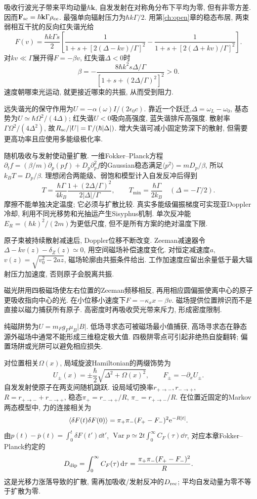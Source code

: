 吸收行波光子带来平均动量$\hbar\mathbf k$, 自发发射在对称角分布下平均为零, 但有非零方差. 因而$\mathbf F_{\rm sc}=\hbar\mathbf k\Gamma\rho_{ee}$. 最强单向辐射压力为$\hbar k\Gamma/2$. 用第\ref{ch:open}章的稳态布居, 两束弱相互干扰的反向红失谐光给
\[F(v)=\frac{\hbar k\Gamma s}{2}\left[\frac1{1+s+[2(\Delta-kv)/\Gamma]^2}-\frac1{1+s+[2(\Delta+kv)/\Gamma]^2}\right].\]
对$kv\ll\Gamma$展开得$F=-\beta v$, 红失谐$\Delta<0$时
\[\beta=-\frac{8\hbar k^2s\Delta/\Gamma}{[1+s+(2\Delta/\Gamma)^2]^2}>0.\]
速度朝哪束光运动, 就更接近哪束的共振, 从而受到阻力.

远失谐光的保守作用为$U=-\alpha(\omega)I/(2\epsilon_0c)$. 靠近一个跃迁,$\Delta=\omega_L-\omega_0$, 基态势为$U\simeq\hbar\Omega^2/(4\Delta)$; 红失谐$U<0$吸向高强度, 蓝失谐排斥高强度. 散射率$\Gamma\Omega^2/(4\Delta^2)$, 故$R_{\rm sc}/|U|=\Gamma/(\hbar|\Delta|)$. 增大失谐可减小固定势深下的散射, 但需要更高功率且应使用多能级极化率.

随机吸收与发射使动量扩散. 一维Fokker--Planck方程$\partial_tf=(\beta/m)\partial_p(pf)+D_p\partial_p^2f$的Gaussian稳态满足$\langle p^2\rangle=mD_p/\beta$, 所以$k_BT=D_p/\beta$. 理想闭合两能级、弱饱和模型计入自发反冲后得到
\[T=\frac{\hbar\Gamma}{4k_B}\frac{1+(2\Delta/\Gamma)^2}{2|\Delta|/\Gamma},\qquad T_{\min}=\frac{\hbar\Gamma}{2k_B}\quad(\Delta=-\Gamma/2).\]
摩擦不能单独决定温度; 它必须与扩散比较. 真实多能级偏振梯度可实现亚Doppler冷却, 利用不同光移势和光抽运产生Sisyphus机制. 单次反冲能$E_R=(\hbar k)^2/(2m)$为更低尺度, 但不是所有方案的绝对温度下限.

原子束被持续散射减速后, Doppler位移不断改变. Zeeman减速器令$\Delta-kv(z)-\delta_Z(z)\simeq0$, 用空间磁场补偿速度变化. 对恒定减速度$a$, $v(z)=\sqrt{v_0^2-2az}$, 磁场轮廓由共振条件给出. 工作加速度应留出余量低于最大辐射压力加速度, 否则原子会脱离共振.

磁光阱用四极磁场使左右位置的Zeeman频移相反, 再用相应圆偏振使离中心的原子更吸收指向中心的光. 在小位移小速度下$F=-\kappa_xx-\beta v$. 磁场提供位置辨识而不是直接以磁力捕获所有原子. 高密度时再吸收荧光带来斥力, 形成密度限制.

纯磁阱势为$U=m_Fg_F\mu_B|B|$. 低场寻求态可被磁场最小值捕获, 高场寻求态在静态源外磁场中通常不能形成三维稳定极大值. 四极阱零点可引起非绝热自旋翻转; 偏置场阱或光阱可以避免相应损失.

对位置相关$\Omega(x)$, 局域旋波Hamiltonian的两缀饰势为
\[U_\pm(x)=\pm\frac{\hbar}{2}\sqrt{\Delta^2+\Omega(x)^2},\qquad
 F_\pm=-\partial_xU_\pm.\]
自发发射使原子在两支间随机跳跃. 设局域切换率$r_{+\to-},r_{-\to+}$, $R=r_{+\to-}+r_{-\to+}$, 稳态$\pi_+=r_{-\to+}/R$, $\pi_-=r_{+\to-}/R$. 在位置近固定的Markov两态模型中, 力的连接相关为
\[\langle\delta F(t)\delta F(0)\rangle=
 \pi_+\pi_-(F_+-F_-)^2\mathrm e^{-R|t|}.\]
由$p(t)-\bar p(t)=\int_0^t\delta F(t')\dd t'$,
$\operatorname{Var}p\simeq2t\int_0^\infty C_F(\tau)\dd\tau$, 对应本章Fokker--Planck约定的
\[D_{\rm dip}=\int_0^\infty C_F(\tau)\,\mathrm d\tau
 =\frac{\pi_+\pi_-(F_+-F_-)^2}{R}.\]
这是光移力涨落导致的扩散, 需再加吸收/发射反冲的$D_{\rm rec}$; 平均自发动量为零不等于扩散为零.

